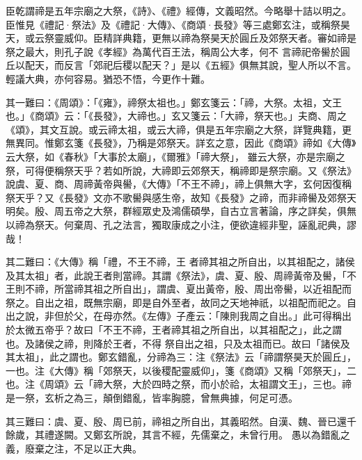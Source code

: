 \begin{pinyinscope}
 臣乾謂禘是五年宗廟之大祭，《詩》、《禮》經傳，文義昭然。今略舉十詰以明之。臣惟見《禮記·祭法》及《禮記·大傳》、《商頌·長發》等三處鄭玄注，或稱祭昊天，或云祭靈威仰。臣精詳典籍，更無以禘為祭昊天於圓丘及郊祭天者。審如禘是祭之最大，則孔子說《孝經》為萬代百王法，稱周公大孝，何不
 言禘祀帝嚳於圓丘以配天，而反言「郊祀后稷以配天？」是以《五經》俱無其說，聖人所以不言。輕議大典，亦何容易。猶恐不悟，今更作十難。



 其一難曰：《周頌》：「《雍》，禘祭太祖也。」鄭玄箋云：「禘，大祭。太祖，文王也。」《商頌》云：「《長發》，大禘也。」玄又箋云：「大禘，祭天也。」夫商、周之《頌》，其文互說。或云禘太祖，或云大禘，俱是五年宗廟之大祭，詳覽典籍，更無異同。惟鄭玄箋《長發》，乃稱是郊祭天。詳玄之意，因此《商頌》禘如《大傳》云大祭，如《春秋》「大事於太廟」，《爾雅》「禘大祭」，
 雖云大祭，亦是宗廟之祭，可得便稱祭天乎？若如所說，大禘即云郊祭天，稱禘即是祭宗廟。又《祭法》說虞、夏、商、周禘黃帝與嚳，《大傳》「不王不禘」，禘上俱無大字，玄何因復稱祭天乎？又《長發》文亦不歌嚳與感生帝，故知《長發》之禘，而非禘嚳及郊祭天明矣。殷、周五帝之大祭，群經眾史及鴻儒碩學，自古立言著論，序之詳矣，俱無以禘為祭天。何棄周、孔之法言，獨取康成之小注，便欲違經非聖，誣亂祀典，謬哉！



 其二難曰：《大傳》稱「禮，不王不禘，王
 者禘其祖之所自出，以其祖配之，諸侯及其太祖」者，此說王者則當禘。其謂《祭法》，虞、夏、殷、周禘黃帝及嚳，「不王則不禘，所當禘其祖之所自出」，謂虞、夏出黃帝，殷、周出帝嚳，以近祖配而祭之。自出之祖，既無宗廟，即是自外至者，故同之天地神祇，以祖配而祀之。自出之說，非但於父，在母亦然。《左傳》子產云：「陳則我周之自出。」此可得稱出於太微五帝乎？故曰「不王不禘，王者禘其祖之所自出，以其祖配之」，此之謂也。及諸侯之禘，則降於王者，不得
 祭自出之祖，只及太祖而已。故曰「諸侯及其太祖」，此之謂也。鄭玄錯亂，分禘為三：注《祭法》云「禘謂祭昊天於圓丘」，一也。注《大傳》稱「郊祭天，以後稷配靈威仰」，箋《商頌》又稱「郊祭天」，二也。注《周頌》云「禘大祭，大於四時之祭，而小於祫，太祖謂文王」，三也。禘是一祭，玄析之為三，顛倒錯亂，皆率胸臆，曾無典據，何足可憑。



 其三難曰：虞、夏、殷、周已前，禘祖之所自出，其義昭然。自漢、魏、晉已還千餘歲，其禮遂闕。又鄭玄所說，其言不經，先儒棄之，未曾行用。
 愚以為錯亂之義，廢棄之注，不足以正大典。




\end{pinyinscope}
